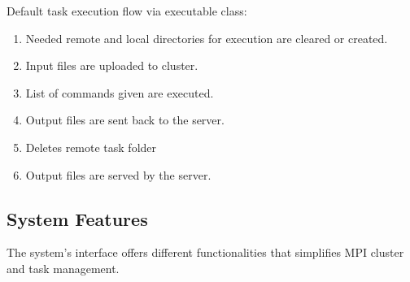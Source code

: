 \documentclass[journal]{./IEEE/IEEEtran}
\begin{document}
		 Default task execution flow via executable class:			
		\begin{enumerate}
			\item  Needed remote and local directories for execution are cleared or created.
			\item  Input files are uploaded to cluster.
			\item  List of commands given are executed.
			\item  Output files are sent back to the server.
			\item  Deletes remote task folder
			\item  Output files are served by the server.
		\end{enumerate}	

	\subsection{System Features}
	The system's interface offers different functionalities that simplifies MPI cluster and task management.
		
\end{document}
